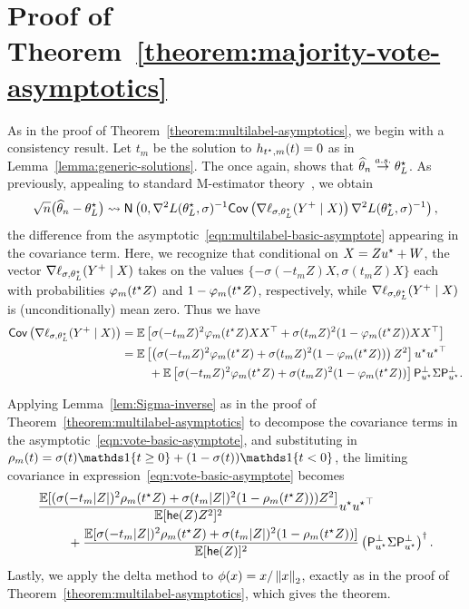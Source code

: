 \section{Proof of Theorem~\ref{theorem:majority-vote-asymptotics}}
\label{sec:proof-majority-vote-asymptotics}

As in the proof of Theorem~\ref{theorem:multilabel-asymptotics}, we begin
with a consistency result. Let $t_m$ be the solution to $h_{t^\star, m}(t) =
0$ as in Lemma~\ref{lemma:generic-solutions}.
The once again, \citet[Thm.~5.4]{ShapiroDeRu09}
shows that $\widehat{\theta}_n \stackrel{a.s.}{\rightarrow} \theta^\star_L$.
As previously, appealing to standard
M-estimator theory~\cite[e.g.][Thm.~5.23]{VanDerVaart98},
we obtain
\begin{equation}
	\label{eqn:vote-basic-asymptote}
	\sqrt{n} \big(\widehat{\theta}_n - \theta^\star_L\big)
	\rightsquigarrow \mathsf{N}\left(0, \nabla^2 L(\theta^\star_L, \sigma)^{-1}
	\mathsf{Cov} \left(\nabla \ell_{\sigma,\theta^\star_L}(Y^+ \mid X)\right)
	\nabla^2 L(\theta^\star_L, \sigma)^{-1} \right),
\end{equation}
the difference from the asymptotic~\eqref{eqn:multilabel-basic-asymptote}
appearing in the covariance term.
Here, we recognize that conditional on $X = Z u^\star + W$, the vector
$\nabla \ell_{\sigma,\theta^\star_L}(Y^+ \mid X)$
takes on the values
$\{-\sigma(-t_m Z) X, \sigma(t_m Z) X\}$ each with probabilities
$\varphi_m(t^\star Z)$ and $1 - \varphi_m(t^\star Z)$, respectively,
while $\nabla \ell_{\sigma,\theta^\star_L}(Y^+ \mid X)$ is (unconditionally)
mean zero.
Thus
we have
\begin{align*}
	\mathsf{Cov} \left(\nabla \ell_{\sigma,\theta^\star_L}(Y^+ \mid X)\right)
	& = \mathbb{E}\left[\sigma(-t_m Z)^2 \varphi_m(t^\star Z) XX^\top
	+ \sigma(t_m Z)^2 (1 - \varphi_m(t^\star Z)) XX^\top\right] \\
	& = \mathbb{E}\left[\left(\sigma(- t_m Z)^2 \varphi_m(t^\star Z)
	+ \sigma(t_m Z)^2 (1 - \varphi_m(t^\star Z))\right) Z^2\right]
	u^\star{u^\star}^\top \\
	& \qquad ~ +
	\mathbb{E}\left[\sigma(- t_m Z)^2 \varphi_m(t^\star Z)
	+ \sigma(t_m Z)^2 (1 - \varphi_m(t^\star Z))\right]
	\mathsf{P}_{u^\star}^\perp \Sigma \mathsf{P}_{u^\star}^\perp.
\end{align*}

Applying Lemma~\ref{lem:Sigma-inverse}
as in the proof of Theorem~\ref{theorem:multilabel-asymptotics}
to  decompose the covariance
terms in the asymptotic~\eqref{eqn:vote-basic-asymptote}, and substituting in $\rho_m(t) = \sigma(t) \ind \{t \geq 0\} + (1- \sigma(t)) \ind \{t < 0\}$,
the limiting covariance in expression~\eqref{eqn:vote-basic-asymptote}
becomes
\begin{align*}
  & \frac{\mathbb{E}[(\sigma(-t_m |Z|)^2 \rho_m(t^\star Z) + \sigma(t_m |Z|)^2
      (1 - \rho_m(t^\star Z))) Z^2]}{
    \mathbb{E}[\mathsf{he}(Z) Z^2]^2}
  u^\star {u^\star}^\top \\
  & \qquad ~ + 
  \frac{\mathbb{E}[\sigma(-t_m |Z|)^2 \rho_m(t^\star Z) + \sigma(t_m |Z|)^2
      (1 - \rho_m(t^\star Z))]}{
    \mathbb{E}[\mathsf{he}(Z)]^2}
  \left({\mathsf{P}_{u^\star}^\perp \Sigma \mathsf{P}_{u^\star}^\perp}\right)^\dagger.
\end{align*}
Lastly, we apply the delta method to $\phi(x) = x / \left\|{x}\right\|_2$,
exactly as in the proof of Theorem~\ref{theorem:multilabel-asymptotics},
which gives the theorem.
